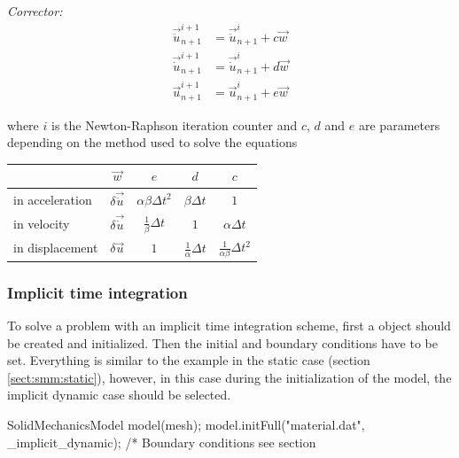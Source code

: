 \noindent\textit{Corrector:}
\begin{align}
  \vec{\ddot{u}}_{n+1}^{i+1} &= \vec{\ddot{u}}_{n+1}^{i} + c \vec{w} \\
  \vec{\dot{u}}_{n+1}^{i+1} &= \vec{\dot{u}}_{n+1}^{i} + d \vec{w} \\
  \vec{u}_{n+1}^{i+1} &= \vec{u}_{n+1}^{i} + e \vec{w}
\end{align}

where  $i$ is  the Newton-Raphson  iteration counter  and $c$,  $d$ and  $e$ are
parameters depending on the method used to solve the equations

\begin{center}
  \begin{tabular}{lcccc}
    \toprule
    & $\vec{w}$ & $e$ & $d$ & $c$\\
    \midrule
    in  acceleration  &$ \delta\vec{\ddot{u}}$  &  $\alpha  \beta \Delta  t^2$
    &$\beta \Delta t$ &$1$\\
    in velocity  & $ \delta\vec{\dot{u}}$&  $\frac{1}{\beta} \Delta t$  & $1$ &
    $\alpha \Delta t$\\
    in displacement  &$\delta\vec{u}$  & $ 1$  & $\frac{1}{\alpha} \Delta  t$ &
    $\frac{1}{\alpha \beta} \Delta t^2$\\
    \bottomrule
  \end{tabular}
\end{center}



\subsubsection{Implicit time integration}
To  solve  a  problem  with   an  implicit  time  integration  scheme,  first  a
 object  should be created and  initialized.  Then the
initial and  boundary conditions have to  be set.  Everything is  similar to the
example  in the static  case (section  \ref{sect:smm:static}), however,  in this
case during the initialization of the model, the implicit dynamic case should be
selected.

\begin{cpp}
  SolidMechanicsModel model(mesh);
  model.initFull("material.dat", _implicit_dynamic);
  /* Boundary conditions see section %
\end{cpp}

